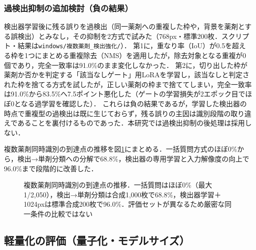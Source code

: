 \documentclass[dvipdfmx]{jsarticle}
\begin{document}
\subsubsection{過検出抑制の追加検討（負の結果）}

検出器学習後に残る誤りを過検出（同一薬剤への重複した枠や，背景を薬剤とする誤検出）とみなし，その抑制を2方式で試みた（768px・標準200枚．スクリプト・結果は\texttt{windows/複数薬剤\_検出強化/}）．
第1に，重なり率（IoU）が0.5を超える枠を1つにまとめる重複除去（NMS）を適用したが，除去対象となる重複が0個であり，完全一致率は91.0\%のまま変化しなかった．
第2に，切り出した枠が薬剤か否かを判定する「該当なしゲート」用LoRAを学習し，該当なしと判定された枠を捨てる方式を試したが，正しい薬剤の枠まで捨ててしまい，完全一致率は91.0\%から83.5\%へ7.5ポイント悪化した（ゲートの学習損失が2エポック目でほぼ0となる過学習を確認した）．
これらは負の結果であるが，学習した検出器の時点で重複型の過検出は既に生じておらず，残る誤りの主因は識別段階の取り違えであることを裏付けるものであった．本研究では過検出抑制の後処理は採用しない．

複数薬剤同時識別の到達点の推移を図\ref{fig:multi_progress}にまとめる．一括質問方式のほぼ0\%から，検出→単剤分類への分解で68.8\%，検出器の専用学習と入力解像度の向上で96.0\%まで段階的に改善した．

\begin{figure}[htbp]
\centering
{}
\caption{複数薬剤同時識別の到達点の推移．一括質問はほぼ0\%（最大1/2,050），検出→単剤分類は合成1,000枚で68.8\%，検出器学習＋1024pxは標準合成200枚で96.0\%．評価セットが異なるため厳密な同一条件の比較ではない}
\label{fig:multi_progress}
\end{figure}

\subsection{軽量化の評価（量子化・モデルサイズ）}\label{sec:light}
\end{document}
